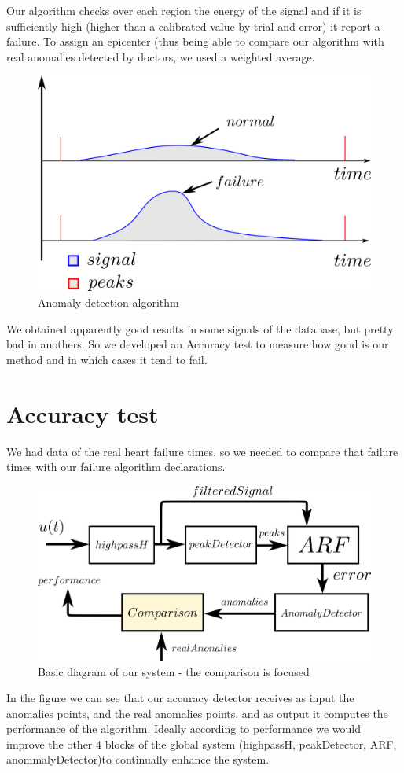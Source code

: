 \documentclass[conference]{IEEEtran}
\begin{document}
Our algorithm checks over each region the energy of the signal and if it is sufficiently high (higher than a calibrated value by trial and error) it report a failure. To assign an epicenter (thus being able to compare our algorithm with real anomalies detected by doctors, we used a weighted average.

\begin{figure}[H]
\centerline{\includegraphics[scale=0.7]{imagenes/anomalyAlgo}}
\caption{Anomaly detection algorithm}
\label{fig}
\end{figure}

We obtained apparently good results in some signals of the database, but pretty bad in anothers. So we developed an Accuracy test to measure how good is our method and in which cases it tend to fail.

\section{Accuracy test}
We had data of the real heart failure times, so we needed to compare that failure times with our failure algorithm declarations. 
\begin{figure}[H]
\centerline{\includegraphics[scale=0.55]{imagenes/diagram2}}
\caption{Basic diagram of our system - the comparison is focused}
\label{fig}
\end{figure}
In the figure we can see that our accuracy detector receives as input the anomalies points, and the real anomalies points, and as output it computes the performance of the algorithm. Ideally according to performance we would improve the other 4 blocks of the global system (highpassH, peakDetector, ARF, anommalyDetector)to continually enhance the system.
\end{document}
